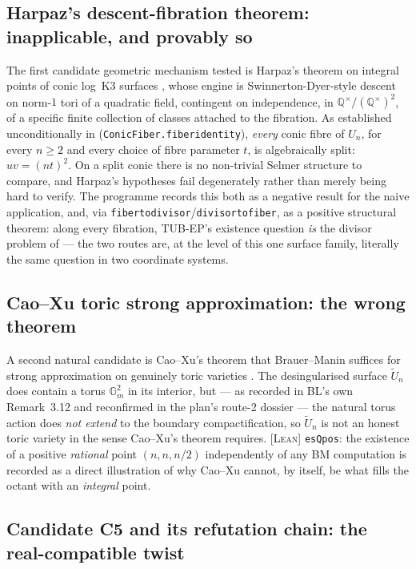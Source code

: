 \documentclass[11pt]{article}
\theoremstyle{plain}
\theoremstyle{definition}
\theoremstyle{remark}
\newcommand{\LEAN}{\textcolor{proved}{\textsc{[Lean]}}}
\newcommand{\lean}[1]{\texttt{#1}}
\renewcommand{\_}{\textunderscore\allowbreak}
\newcommand{\Q}{\mathbb{Q}}
\begin{document}
\subsection{Harpaz's descent-fibration theorem: inapplicable, and provably so}
\label{subsec:harpaz}

The first candidate geometric mechanism tested is Harpaz's theorem on integral points of conic
log~K3 surfaces \cite{Harpaz2019}, whose engine is Swinnerton-Dyer-style descent on norm-$1$ tori
of a quadratic field, contingent on independence, in $\Q^\times/(\Q^\times)^2$, of a specific
finite collection of classes attached to the fibration. As established unconditionally in
 (\lean{ConicFiber.fiber\_identity}), \emph{every} conic fibre of $U_n$,
for every $n\ge2$ and every choice of fibre parameter $t$, is algebraically split: $uv=(nt)^2$.
On a split conic there is no non-trivial Selmer structure to compare, and Harpaz's hypotheses
fail degenerately rather than merely being hard to verify. The programme records this both as a
negative result for the naive application, and, via
\lean{fiber\_to\_divisor}/\lean{divisor\_to\_fiber}, as a positive structural theorem: along every
fibration, TUB-EP's existence question \emph{is} the divisor problem of  — the
two routes are, at the level of this one surface family, literally the same question in two
coordinate systems.

\subsection{Cao--Xu toric strong approximation: the wrong theorem}

A second natural candidate is Cao--Xu's theorem that Brauer--Manin suffices for strong
approximation on genuinely toric varieties \cite{CaoXu2018}. The desingularised surface
$\widetilde U_n$ does contain a torus $\mathbb G_m^2$ in its interior, but — as recorded in BL's
own Remark~3.12 and reconfirmed in the plan's route-2 dossier — the natural torus action does
\emph{not extend} to the boundary compactification, so $\widetilde U_n$ is not an honest toric
variety in the sense Cao--Xu's theorem requires. \LEAN{} \lean{esQ\_pos}: the existence of a
positive \emph{rational} point $(n,n,n/2)$ independently of any BM computation is recorded as a
direct illustration of why Cao--Xu cannot, by itself, be what fills the octant with an
\emph{integral} point.

\subsection{Candidate C5 and its refutation chain: the real-compatible twist}
\label{subsec:c5}
\end{document}

